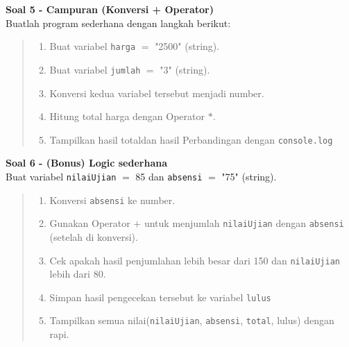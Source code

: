 \documentclass[12pt]{article}
\begin{document}
\textbf{Soal 5 - Campuran (Konversi + Operator)} \\

Buatlah program sederhana dengan langkah berikut:
\begin{quote}
\begin{enumerate}
        \item Buat variabel \verb+harga+ $=$ "2500" (string).
        \item Buat variabel \verb+jumlah+ $=$ "3" (string).
        \item Konversi kedua variabel tersebut menjadi number.
        \item Hitung total harga dengan Operator $\ast$.
        \item Tampilkan hasil totaldan hasil Perbandingan dengan \verb+console.log+  
\end{enumerate}
\end{quote}

\textbf{Soal 6 - (Bonus) Logic sederhana} \\

Buat variabel \verb+nilaiUjian+ $=$ 85 dan \verb+absensi+ $=$ "75" (string).

\begin{quote}
\begin{enumerate}
        \item Konversi \verb+absensi+ ke number.
        \item Gunakan Operator $+$ untuk menjumlah \verb+nilaiUjian+ dengan \verb+absensi+ (setelah di konversi).
        \item Cek apakah hasil penjumlahan lebih besar dari 150 dan \verb+nilaiUjian+ lebih dari 80.
        \item Simpan hasil pengecekan tersebut ke variabel \verb+lulus+
        \item Tampilkan semua nilai(\verb+nilaiUjian+, \verb+absensi+, \verb+total+, \verb++lulus) dengan rapi.
\end{enumerate}
\end{quote}
\end{document}
